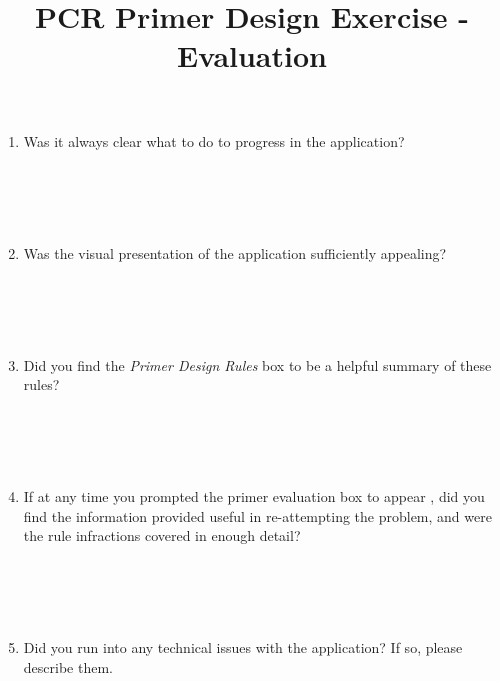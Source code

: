 \documentclass[A4paper]{article}
\title{PCR Primer Design Exercise - Evaluation}
\begin{document}
\maketitle


\begin{enumerate}
\item Was it always clear what to do to progress in the application? \\ \\ \\ \\ \\
\item Was the visual presentation of the application sufficiently appealing? \\ \\ \\ \\ \\
\item Did you find the \textit{Primer Design Rules} box to be a helpful summary of these rules? \\ \\ \\ \\ \\
\item If at any time you prompted the primer evaluation box to appear %
	 , did you find the information provided useful in re-attempting the problem, and were the 
	 rule infractions covered in enough detail? \\ \\ \\ \\ \\
\item Did you run into any technical issues with the application? If so, please describe them.
\end{enumerate}
\end{document}
